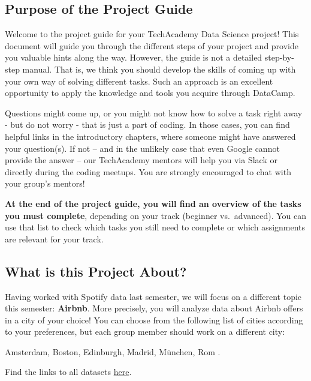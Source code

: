 \documentclass[
  11pt,
]{article}
\begin{document}
\hypertarget{purpose-of-the-project-guide}{%
\subsection{Purpose of the Project Guide}\label{purpose-of-the-project-guide}}

Welcome to the project guide for your TechAcademy Data Science project! This document will guide you through the different steps of your project and provide you valuable hints along the way. However, the guide is not a detailed step-by-step manual. That is, we think you should develop the skills of coming up with your own way of solving different tasks. Such an approach is an excellent opportunity to apply the knowledge and tools you acquire through DataCamp.

Questions might come up, or you might not know how to solve a task right away - but do not worry - that is just a part of coding. In those cases, you can find helpful links in the introductory chapters, where someone might have answered your question(s). If not -- and in the unlikely case that even Google cannot provide the answer -- our TechAcademy mentors will help you via Slack or directly during the coding meetups. You are strongly encouraged to chat with your group's mentors!

\textbf{At the end of the project guide, you will find an overview of the tasks you must complete}, depending on your track (beginner vs.~advanced). You can use that list to check which tasks you still need to complete or which assignments are relevant for your track.

\hypertarget{what-is-this-project-about}{%
\subsection{What is this Project About?}\label{what-is-this-project-about}}

Having worked with Spotify data last semester, we will focus on a different topic this semester: \textbf{Airbnb}. More precisely, you will analyze data about Airbnb offers in a city of your choice!
You can choose from the following list of cities according to your preferences, but each group member should work on a different city:

Amsterdam,
Boston,
Edinburgh,
Madrid,
München,
Rom .

Find the links to all datasets \href{https://docs.google.com/document/d/1nBkeJmpnoiATVw4B3DwrB45uo0TpQFE_iTisyh4p9Ro/edit?usp=sharing}{here}.
\end{document}
